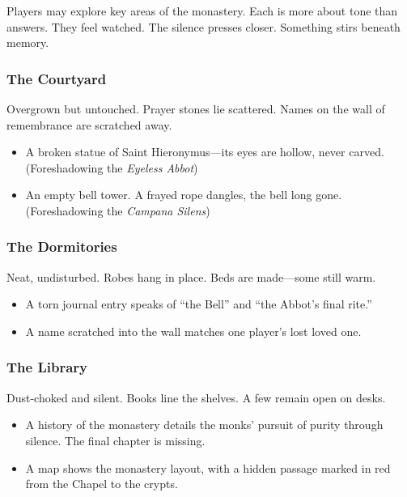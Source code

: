 \documentclass[twocolumn,nodeprecatedcode,bg=print]{dndbook/dndbook}
\begin{document}
Players may explore key areas of the monastery. Each is more about tone than answers. They feel watched. The silence presses closer. Something stirs beneath memory.

\subsubsection{The Courtyard}
Overgrown but untouched. Prayer stones lie scattered. Names on the wall of remembrance are scratched away.

\begin{WyrdExample}
    \begin{itemize}
        \item A broken statue of Saint Hieronymus—its eyes are hollow, never carved. (Foreshadowing the \emph{Eyeless Abbot})
        \item An empty bell tower. A frayed rope dangles, the bell long gone. (Foreshadowing the \emph{Campana Silens})
    \end{itemize}
\end{WyrdExample}

\subsubsection{The Dormitories}
Neat, undisturbed. Robes hang in place. Beds are made—some still warm.

\begin{WyrdExample}
    \begin{itemize}
        \item A torn journal entry speaks of “the Bell” and “the Abbot’s final rite.”
        \item A name scratched into the wall matches one player’s lost loved one.
    \end{itemize}
\end{WyrdExample}

\subsubsection{The Library}
Dust-choked and silent. Books line the shelves. A few remain open on desks.

\begin{WyrdExample}
    \begin{itemize}
        \item A history of the monastery details the monks’ pursuit of purity through silence. The final chapter is missing.
        \item A map shows the monastery layout, with a hidden passage marked in red from the Chapel to the crypts.
    \end{itemize}
\end{WyrdExample}
\end{document}

